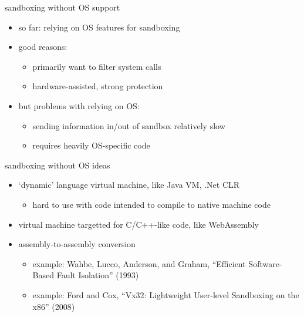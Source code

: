 \begin{frame}{sandboxing without OS support}
    \begin{itemize}
    \item so far: relying on OS features for sandboxing
    \item good reasons:
        \begin{itemize}
        \item primarily want to filter system calls
        \item hardware-assisted, strong protection
        \end{itemize}
    \vspace{.5cm}
    \item but problems with relying on OS:
        \begin{itemize}
        \item sending information in/out of sandbox relatively slow
        \item requires heavily OS-specific code
        \end{itemize}
    \end{itemize}
\end{frame}

\begin{frame}{sandboxing without OS ideas}
    \begin{itemize}
    \item `dynamic' language virtual machine, like Java VM, .Net CLR
        \begin{itemize}
        \item hard to use with code intended to compile to native machine code
        \end{itemize}
    \vspace{.5cm}
    \item virtual machine targetted for C/C++-like code, like WebAssembly
    \vspace{.5cm}
    \item assembly-to-assembly conversion
        \begin{itemize}
        \item example: Wahbe, Lucco, Anderson, and Graham, ``Efficient Software-Based Fault Isolation'' (1993)
        \item example: Ford and Cox, ``Vx32: Lightweight User-level Sandboxing on the x86'' (2008)
        \end{itemize}
    \end{itemize}
\end{frame}
